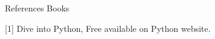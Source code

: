 References Books 

[1] Dive into Python, Free available on Python website.

%
%
%
% 
%
%
% 
%
%
%
%
%
% 
%
% 
%
%
% 
%
